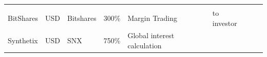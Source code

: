 \documentclass[english,]{IEEEtran}
\begin{document}
\begin{table}[t]
\begin{center}
\begin{supertabular}[]{@{}llllllll@{}}
\begin{minipage}[t]{0.06\textwidth}
\strut
\end{minipage}\tabularnewline
\begin{minipage}[t]{0.09\textwidth}\raggedright
BitShares\strut
\end{minipage} & \begin{minipage}[t]{0.04\textwidth}\raggedright
USD\strut
\end{minipage} & \begin{minipage}[t]{0.13\textwidth}\raggedright
Bitshares\strut
\end{minipage} & \begin{minipage}[t]{0.06\textwidth}\raggedright
300\%\strut
\end{minipage} & \begin{minipage}[t]{0.21\textwidth}\raggedright
Margin Trading\strut
\end{minipage} & \begin{minipage}[t]{0.11\textwidth}\raggedright
to investor\strut
\end{minipage} & \begin{minipage}[t]{0.09\textwidth}\raggedright
\strut
\end{minipage} & \begin{minipage}[t]{0.06\textwidth}\raggedright
\strut
\end{minipage}\tabularnewline
\begin{minipage}[t]{0.09\textwidth}\raggedright
Synthetix\strut
\end{minipage} & \begin{minipage}[t]{0.04\textwidth}\raggedright
USD\strut
\end{minipage} & \begin{minipage}[t]{0.13\textwidth}\raggedright
SNX\strut
\end{minipage} & \begin{minipage}[t]{0.06\textwidth}\raggedright
750\%\strut
\end{minipage} & \begin{minipage}[t]{0.21\textwidth}\raggedright
Global interest calculation\strut
\end{minipage} & \begin{minipage}[t]{0.11\textwidth}\raggedright
\strut
\end{minipage} & \begin{minipage}[t]{0.09\textwidth}\raggedright
\strut
\end{minipage} & \begin{minipage}[t]{0.06\textwidth}\raggedright
\strut
\end{minipage}\tabularnewline

\end{supertabular}
\end{center}
\end{table}
\end{document}
